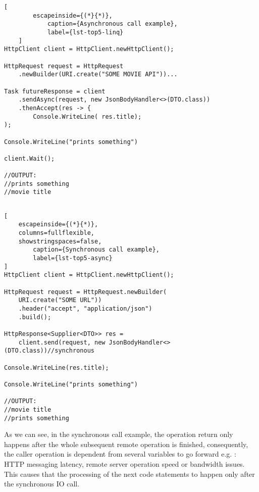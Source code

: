 \begin{center}
	\lstset{basicstyle=\scriptsize\ttfamily,frame=bottomline}
	\begin{minipage}{.48\textwidth}
	\begin{lstlisting}[
		escapeinside={(*}{*)},
			caption={Asynchronous call example},
			label={lst-top5-linq}
	]
HttpClient client = HttpClient.newHttpClient();

HttpRequest request = HttpRequest
	.newBuilder(URI.create("SOME MOVIE API"))...

Task futureResponse = client
	.sendAsync(request, new JsonBodyHandler<>(DTO.class)) 
	.thenAccept(res -> {
		Console.WriteLine( res.title);
); 

Console.WriteLine("prints something")

client.Wait();

//OUTPUT:
//prints something
//movie title
		
\end{lstlisting}
\end{minipage}
\hfill
\begin{minipage}{.48\textwidth}
\lstset{basicstyle=\scriptsize\ttfamily,frame=bottomline}
\begin{lstlisting}[
	escapeinside={(*}{*)},
	columns=fullflexible,
	showstringspaces=false,
		caption={Synchronous call example},
		label={lst-top5-async}
]
HttpClient client = HttpClient.newHttpClient();

HttpRequest request = HttpRequest.newBuilder(
	URI.create("SOME URL"))
	.header("accept", "application/json")
	.build();

HttpResponse<Supplier<DTO>> res = 
	client.send(request, new JsonBodyHandler<>(DTO.class))//synchronous

Console.WriteLine(res.title);

Console.WriteLine("prints something")

//OUTPUT:
//movie title
//prints something

		\end{lstlisting}
	\end{minipage}
\end{center}

	
	As we can see, in the synchronous call example, the operation return only happens after the whole subsequent remote operation is finished, consequently, the caller operation is dependent from several variables to go forward e.g. : HTTP messaging latency, remote server operation speed or bandwidth issues. 
	This causes that the processing of the next code statements to happen only after the synchronous IO call.

